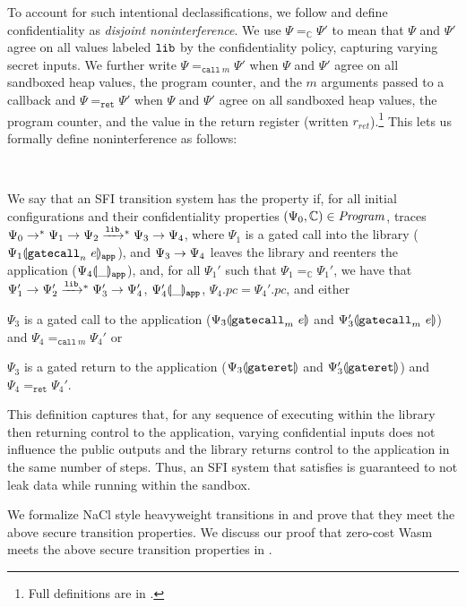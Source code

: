 To account for such intentional declassifications, we follow
\citet{matos_declassification_2005} and define confidentiality as
\emph{disjoint noninterference}.
%
We use $\Psi =_{\mathbb{C}} \Psi'$ to mean that $\Psi$ and $\Psi'$ agree on all values
labeled $\mathtt{lib}$ by the confidentiality policy, capturing varying secret inputs.
%
We further write $\Psi =_{\mathtt{call}\ m} \Psi'$ when $\Psi$ and $\Psi'$
agree on all sandboxed heap values, the program counter, and the $m$ arguments
passed to a callback and $\Psi =_{\mathtt{ret}} \Psi'$ when $\Psi$ and
$\Psi'$ agree on all sandboxed heap values, the program counter, and the value
in the return register (written $r_{ret}$).\footnote{Full definitions are in
.}
%
This lets us formally define noninterference as follows:

\begin{definition}[\StrongNI{}]{~}

  We say that an SFI transition system has the \strongni{} property if,
  for all initial configurations and their confidentiality properties $(\Psi_0, \mathbb{C}) \in \mathit{Program}$,
  traces $\Psi_0 \stepstar \Psi_1 \step \Psi_2 \steplowstar \Psi_3 \step \Psi_4$,
  where $\Psi_1$ is a gated call into the library
  (${\Psi_1}\llparenthesis{\ensuremath{\mathtt{gatecall}_{n}\ {e}}}\rrparenthesis_{\mathtt{app}}$),
  and $\Psi_3 \mathrel{\rightarrow} \Psi_4$ leaves the library and reenters the application
  (${\Psi_4}\llparenthesis{\_}\rrparenthesis_{\mathtt{app}}$),
  and, for all $\Psi_1'$ such that $\Psi_1 =_{\mathbb{C}}
  \Psi_1'$, we have that $\Psi_1' \step \Psi_2' \steplowstar \Psi_3' \step \Psi_4'$,
  ${\Psi_4'}\llparenthesis{\_}\rrparenthesis_{\mathtt{app}}$, $\Psi_4.pc = \Psi_4'.pc$, and either
  \begin{enumerate*}
  \item $\Psi_3$ is a gated call to the application (${\Psi_3}\llparenthesis{\ensuremath{\mathtt{gatecall}_{m}\ {e}}}\rrparenthesis$ and ${\Psi_3'}\llparenthesis{\ensuremath{\mathtt{gatecall}_{m}\ {e}}}\rrparenthesis$) and $\Psi_4 =_{\mathtt{call}\ m} \Psi_4'$ or
  \item $\Psi_3$ is a gated return to the application (${\Psi_3}\llparenthesis{\ensuremath{\mathtt{gateret}}}\rrparenthesis$ and ${\Psi_3'}\llparenthesis{\ensuremath{\mathtt{gateret}}}\rrparenthesis$) and $\Psi_4 =_{\mathtt{ret}} \Psi_4'$.
  \end{enumerate*}
\end{definition}
%
This definition captures that, for any sequence of executing
within the library then returning control to the application, varying
confidential inputs does not influence the public outputs and the library
returns control to the application in the same number of steps.
%
Thus, an SFI system that satisfies \StrongNI{} is guaranteed
to not leak data while running within the sandbox.

We formalize NaCl style heavyweight transitions in
 and prove that they meet the above secure
transition properties.
%
We discuss our proof that zero-cost Wasm meets the above secure transition
properties in .
